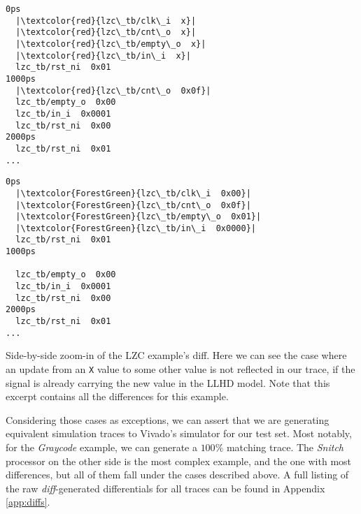\begin{listing}[ht]
    \lstset{
        escapeinside=||,
        basicstyle=\footnotesize\ttfamily,
        stepnumber=1
    }
    \begin{minipage}{0.45\textwidth}
        \begin{lstlisting}
0ps
  |\textcolor{red}{lzc\_tb/clk\_i  x}|
  |\textcolor{red}{lzc\_tb/cnt\_o  x}|
  |\textcolor{red}{lzc\_tb/empty\_o  x}|
  |\textcolor{red}{lzc\_tb/in\_i  x}|
  lzc_tb/rst_ni  0x01
1000ps
  |\textcolor{red}{lzc\_tb/cnt\_o  0x0f}|
  lzc_tb/empty_o  0x00
  lzc_tb/in_i  0x0001
  lzc_tb/rst_ni  0x00
2000ps
  lzc_tb/rst_ni  0x01
...
        \end{lstlisting}
    \end{minipage}
    \hfill
    \begin{minipage}{0.45\textwidth}
        \begin{lstlisting}
0ps
  |\textcolor{ForestGreen}{lzc\_tb/clk\_i  0x00}|
  |\textcolor{ForestGreen}{lzc\_tb/cnt\_o  0x0f}|
  |\textcolor{ForestGreen}{lzc\_tb/empty\_o  0x01}|
  |\textcolor{ForestGreen}{lzc\_tb/in\_i  0x0000}|
  lzc_tb/rst_ni  0x01
1000ps

  lzc_tb/empty_o  0x00
  lzc_tb/in_i  0x0001
  lzc_tb/rst_ni  0x00
2000ps
  lzc_tb/rst_ni  0x01
...
        \end{lstlisting}
    \end{minipage}
    \caption[Side-by-side zoom-in of the LZC example's diff.]{Side-by-side zoom-in of the LZC example's diff. Here we can see the case where an update from an \texttt{X} value to some other value is not reflected in our trace, if the signal is already carrying the new value in the LLHD model. Note that this excerpt contains all the differences for this example.}
    \label{listing:diff-lzc}
\end{listing}

Considering those cases as exceptions, we can assert that we are generating equivalent simulation traces to Vivado's simulator for our test set. Most notably, for the \textit{Graycode} example, we can generate a $100\%$ matching trace. The \textit{Snitch} processor on the other side is the most complex example, and the one with most differences, but all of them fall under the cases described above. A full listing of the raw \textit{diff}-generated differentials for all traces can be found in Appendix \ref{app:diffs}.


